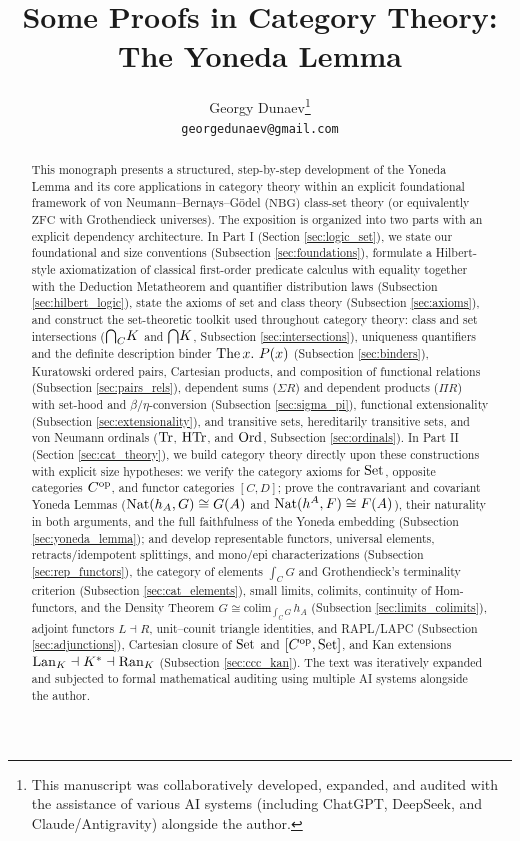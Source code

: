 \documentclass[10pt,a4paper]{article}
\title{Some Proofs in Category Theory: The Yoneda Lemma}
\author{Georgy Dunaev\thanks{This manuscript was collaboratively developed, expanded, and audited with the assistance of various AI systems (including ChatGPT, DeepSeek, and Claude/Antigravity) alongside the author.} \\ \texttt{georgedunaev@gmail.com}}
\date{}
\begin{document}
\maketitle

\begin{abstract}
This monograph presents a structured, step-by-step development of the Yoneda Lemma and its core applications in category theory within an explicit foundational framework of von Neumann--Bernays--G\"odel ($\mathrm{NBG}$) class-set theory (or equivalently $\mathrm{ZFC}$ with Grothendieck universes). The exposition is organized into two parts with an explicit dependency architecture. In Part I (Section \ref{sec:logic_set}), we state our foundational and size conventions (Subsection \ref{sec:foundations}), formulate a Hilbert-style axiomatization of classical first-order predicate calculus with equality together with the Deduction Metatheorem and quantifier distribution laws (Subsection \ref{sec:hilbert_logic}), state the axioms of set and class theory (Subsection \ref{sec:axioms}), and construct the set-theoretic toolkit used throughout category theory: class and set intersections (${{\bigcap}_C} K$ and ${\bigcap} K$, Subsection \ref{sec:intersections}), uniqueness quantifiers and the definite description binder ${\textrm{The\,}} x.\ P(x)$ (Subsection \ref{sec:binders}), Kuratowski ordered pairs, Cartesian products, and composition of functional relations (Subsection \ref{sec:pairs_rels}), dependent sums ($\Sigma R$) and dependent products ($\Pi R$) with set-hood and $\beta/\eta$-conversion (Subsection \ref{sec:sigma_pi}), functional extensionality (Subsection \ref{sec:extensionality}), and transitive sets, hereditarily transitive sets, and von Neumann ordinals (${\textrm{Tr}}$, ${\textrm{HTr}}$, and ${\textrm{Ord}}$, Subsection \ref{sec:ordinals}). In Part II (Section \ref{sec:cat_theory}), we build category theory directly upon these constructions with explicit size hypotheses: we verify the category axioms for ${\textrm{Set}}$, opposite categories $C^{\textrm{op}}$, and functor categories $[C, D]$; prove the contravariant and covariant Yoneda Lemmas (${\textrm{Nat}}(h_A, G) \cong G(A)$ and ${\textrm{Nat}}(h^A, F) \cong F(A)$), their naturality in both arguments, and the full faithfulness of the Yoneda embedding (Subsection \ref{sec:yoneda_lemma}); and develop representable functors, universal elements, retracts/idempotent splittings, and mono/epi characterizations (Subsection \ref{sec:rep_functors}), the category of elements $\int_C G$ and Grothendieck's terminality criterion (Subsection \ref{sec:cat_elements}), small limits, colimits, continuity of Hom-functors, and the Density Theorem $G \cong \mathrm{colim}_{\int_C G}\, h_A$ (Subsection \ref{sec:limits_colimits}), adjoint functors $L \dashv R$, unit--counit triangle identities, and RAPL/LAPC (Subsection \ref{sec:adjunctions}), Cartesian closure of ${\textrm{Set}}$ and $[C^{\textrm{op}}, {\textrm{Set}}]$, and Kan extensions ${\mathrm{Lan}}_K \dashv K^* \dashv {\mathrm{Ran}}_K$ (Subsection \ref{sec:ccc_kan}). The text was iteratively expanded and subjected to formal mathematical auditing using multiple AI systems alongside the author.
\end{abstract}
\end{document}
